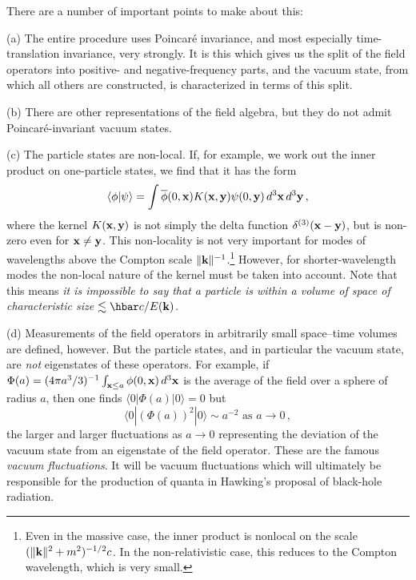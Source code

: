 \documentclass[12pt]{article}
\begin{document}
There are a number of important points to make about this:


(a) The entire procedure uses Poincar\'e invariance, and most especially time-translation invariance, very strongly.  It is this which gives us the split of the field operators into positive- and negative-frequency parts, and the vacuum state, from which all others are constructed, is characterized in terms of this split.

(b) There are other representations of the field algebra, but they do not admit 
Poincar\'e-invariant vacuum states.  


(c)
The particle states are non-local.  If, for example, we work out the inner product on one-particle states, we find that it has the form
\begin{equation}
  \langle \phi |\psi\rangle =\int {\overline\phi}(0,{\bf x})K({\bf x},{\bf y})\psi (0,{\bf y})\, d^3{\bf x}\, d^3{\bf y}\, ,
\end{equation}
where the kernel $K({\bf x},{\bf y})$ is not simply the delta function $\delta ^{(3)}({\bf x}-{\bf y})$, but is non-zero even for ${\bf x}\not={\bf y}$.  This non-locality is not very important for modes of wavelengths above the Compton scale $\|{\bf k}\| ^{-1}$.\footnote{Even in the massive case, the inner product is nonlocal on the scale $(\| {\bf k}\|^2+m^2)^{-1/2}c$.  In the non-relativistic case, this reduces to the Compton wavelength, which is very small.}  However, for 
shorter-wavelength modes the non-local nature of the kernel must be taken into account.
Note that this means {\em it is impossible to say that a particle is within a volume of space of characteristic size $\lesssim \hbar c/E({\bf k})$.}

(d) Measurements of the field operators in arbitrarily small space--time volumes are defined, however.  But the particle states, and in particular the vacuum state, are {\em not} eigenstates of these operators.  For example, if $\Phi (a) =(4\pi a^3/3)^{-1}\int _{{\bf x}\leq a}\phi (0,{\bf x})\, d^3{\bf x}$ is the average of the field over a sphere of radius $a$, then one finds $\langle 0|\Phi (a)|0\rangle =0$ but
\begin{equation}
\langle 0|(\Phi (a))^2|0\rangle\sim a^{-2}\mbox{  as  }a\to 0\, ,
\end{equation}
the larger and larger fluctuations as $a\to 0$ representing the deviation of the vacuum state from an eigenstate of the field operator.  These are the famous {\em vacuum fluctuations}.
It will be vacuum fluctuations which will ultimately be responsible for the production of quanta in Hawking's proposal of black-hole radiation.
\end{document}
